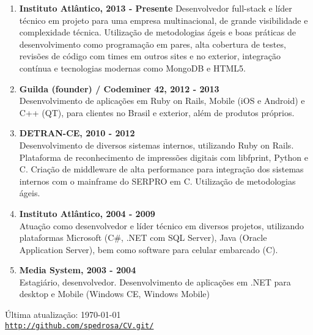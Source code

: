 \documentclass[letterpaper]{article}
\def\footerlink{http://github.com/spedrosa/CV.git/}
\begin{document}
\begin{enumerate}
  \item
  \textbf{Instituto Atlântico, 2013 - Presente}
  Desenvolvedor full-stack e líder técnico em projeto para uma empresa multinacional, de grande visibilidade e complexidade técnica. Utilização de metodologias ágeis e boas práticas de desenvolvimento como programação em pares, alta cobertura de testes, revisões de código com times em outros sites e no exterior, integração contínua e tecnologias modernas como MongoDB e HTML5.
  \item
  \textbf{Guilda (founder) / Codeminer 42, 2012 - 2013 } \\
  Desenvolvimento de aplicações em Ruby on Rails, Mobile (iOS e Android) e C++ (QT), para clientes no Brasil e exterior, além de produtos próprios.
  \item
  \textbf{DETRAN-CE, 2010 - 2012} \\
  Desenvolvimento de diversos sistemas internos, utilizando Ruby on Rails. Plataforma de reconhecimento de impressões digitais com libfprint, Python e C. Criação de middleware de alta performance para integração dos sistemas internos com o mainframe do SERPRO em C. Utilização de metodologias ágeis.
  \item
  \textbf{Instituto Atlântico, 2004 - 2009 } \\
  Atuação como desenvolvedor e líder técnico em diversos projetos, utilizando plataformas Microsoft (C\#, .NET com SQL Server), Java (Oracle Application Server), bem como software para celular embarcado (C).
  \item
  \textbf{Media System, 2003 - 2004} \\
  Estagiário, desenvolvedor. Desenvolvimento de aplicações em .NET para desktop e Mobile (Windows CE, Windows Mobile)
\end{enumerate}

\bigskip

\begin{center}
  \begin{footnotesize}
    Última atualização: \today \\
    \href{\footerlink}{\texttt{\footerlink}}
  \end{footnotesize}
\end{center}
\end{document}
